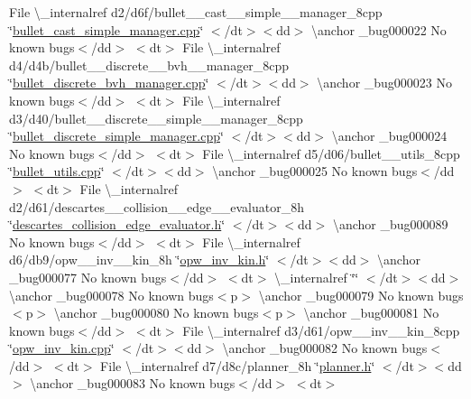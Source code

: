 \begin{DoxyRefList}
\+File \textbackslash{}\+\_\+internalref d2/d6f/bullet\+\_\+\+\_\+cast\+\_\+\+\_\+simple\+\_\+\+\_\+manager\+\_\+8cpp \char`\"{}\mbox{\hyperlink{bullet__cast__simple__manager_8cpp}{bullet\+\_\+cast\+\_\+simple\+\_\+manager.\+cpp}}\char`\"{} $<$/dt$>$$<$dd$>$ \textbackslash{}anchor \+\_\+bug000022 No known bugs$<$/dd$>$ $<$dt$>$
\+File \textbackslash{}\+\_\+internalref d4/d4b/bullet\+\_\+\+\_\+discrete\+\_\+\+\_\+bvh\+\_\+\+\_\+manager\+\_\+8cpp \char`\"{}\mbox{\hyperlink{bullet__discrete__bvh__manager_8cpp}{bullet\+\_\+discrete\+\_\+bvh\+\_\+manager.\+cpp}}\char`\"{} $<$/dt$>$$<$dd$>$ \textbackslash{}anchor \+\_\+bug000023 No known bugs$<$/dd$>$ $<$dt$>$
\+File \textbackslash{}\+\_\+internalref d3/d40/bullet\+\_\+\+\_\+discrete\+\_\+\+\_\+simple\+\_\+\+\_\+manager\+\_\+8cpp \char`\"{}\mbox{\hyperlink{bullet__discrete__simple__manager_8cpp}{bullet\+\_\+discrete\+\_\+simple\+\_\+manager.\+cpp}}\char`\"{} $<$/dt$>$$<$dd$>$ \textbackslash{}anchor \+\_\+bug000024 No known bugs$<$/dd$>$ $<$dt$>$
\+File \textbackslash{}\+\_\+internalref d5/d06/bullet\+\_\+\+\_\+utils\+\_\+8cpp \char`\"{}\mbox{\hyperlink{bullet__utils_8cpp}{bullet\+\_\+utils.\+cpp}}\char`\"{} $<$/dt$>$$<$dd$>$ \textbackslash{}anchor \+\_\+bug000025 No known bugs$<$/dd$>$ $<$dt$>$
\+File \textbackslash{}\+\_\+internalref d2/d61/descartes\+\_\+\+\_\+collision\+\_\+\+\_\+edge\+\_\+\+\_\+evaluator\+\_\+8h \char`\"{}\mbox{\hyperlink{descartes__collision__edge__evaluator_8h}{descartes\+\_\+collision\+\_\+edge\+\_\+evaluator.\+h}}\char`\"{} $<$/dt$>$$<$dd$>$ \textbackslash{}anchor \+\_\+bug000089 No known bugs$<$/dd$>$ $<$dt$>$
\+File \textbackslash{}\+\_\+internalref d6/db9/opw\+\_\+\+\_\+inv\+\_\+\+\_\+kin\+\_\+8h \char`\"{}\mbox{\hyperlink{opw__inv__kin_8h}{opw\+\_\+inv\+\_\+kin.\+h}}\char`\"{} $<$/dt$>$$<$dd$>$ \textbackslash{}anchor \+\_\+bug000077 No known bugs$<$/dd$>$ $<$dt$>$
 \textbackslash{}\+\_\+internalref  \char`\"{}\char`\"{} $<$/dt$>$$<$dd$>$ \textbackslash{}anchor \+\_\+bug000078 No known bugs$<$p$>$ \textbackslash{}anchor \+\_\+bug000079 No known bugs$<$p$>$ \textbackslash{}anchor \+\_\+bug000080 No known bugs$<$p$>$ \textbackslash{}anchor \+\_\+bug000081 No known bugs$<$/dd$>$ $<$dt$>$
\+File \textbackslash{}\+\_\+internalref d3/d61/opw\+\_\+\+\_\+inv\+\_\+\+\_\+kin\+\_\+8cpp \char`\"{}\mbox{\hyperlink{opw__inv__kin_8cpp}{opw\+\_\+inv\+\_\+kin.\+cpp}}\char`\"{} $<$/dt$>$$<$dd$>$ \textbackslash{}anchor \+\_\+bug000082 No known bugs$<$/dd$>$ $<$dt$>$
\+File \textbackslash{}\+\_\+internalref d7/d8c/planner\+\_\+8h \char`\"{}\mbox{\hyperlink{planner_8h}{planner.\+h}}\char`\"{} $<$/dt$>$$<$dd$>$ \textbackslash{}anchor \+\_\+bug000083 No known bugs$<$/dd$>$ $<$dt$>$
$$
\end{DoxyRefList}
